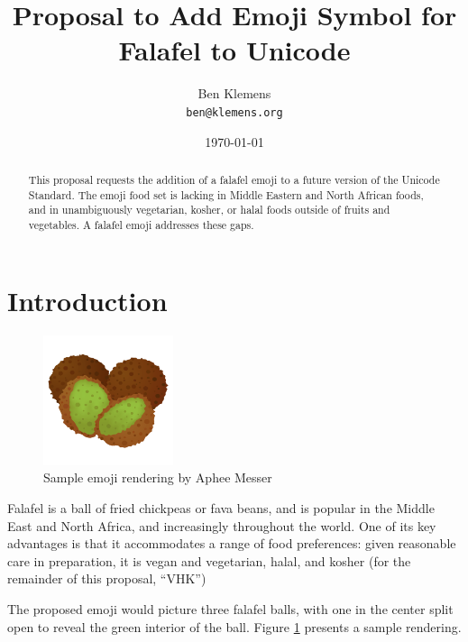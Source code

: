 \documentclass[a4paper,10pt]{article}
\begin{document}




\title{Proposal to Add Emoji Symbol for {\sc Falafel} to Unicode}
\author{Ben Klemens\\ {\tt ben@klemens.org}}
\date{\today}
\maketitle

\begin{abstract}
This proposal requests the addition of a {\sc falafel} emoji to a future version of the
Unicode Standard.  The emoji food set is lacking in Middle Eastern and North African
foods, and in unambiguously vegetarian, kosher, or halal foods outside of fruits and
vegetables. A falafel emoji addresses these gaps.
\end{abstract}


\section{Introduction}

\begin{figure}
\begin{center}
\includegraphics[width=1.5in]{falafel.png}
\end{center}
\caption{Sample emoji rendering by Aphee Messer}
\label{apheefig}
\end{figure}

{\sc Falafel} is a ball of fried chickpeas or fava beans, and is popular in the Middle East
and North Africa, and increasingly throughout the world.  One of its key advantages is
that it accommodates a range of food preferences: given reasonable care in preparation,
it is vegan and vegetarian, halal, and kosher (for the remainder of this proposal, ``VHK'')

The proposed emoji would picture three falafel balls, with one in the center split open to
reveal the green interior of the ball. Figure \ref{apheefig} presents a sample rendering.
\end{document}
